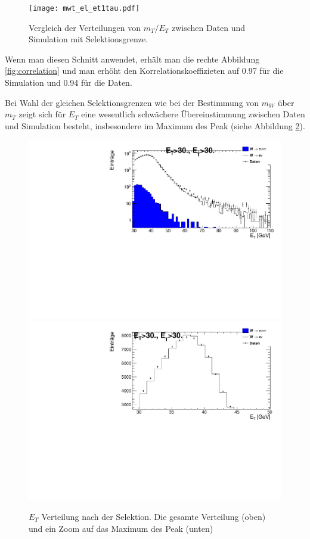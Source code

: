 \documentclass[a4paper,12pt]{article}
\begin{document}
\begin{figure}[htb]
	\centering
	\texttt{[image: mwt\_el\_et1tau.pdf]}
	\caption{Vergleich der Verteilungen von $m_T/E_T$ zwischen Daten und Simulation mit
	Selektionsgrenze.}
	\label{fig:verhaeltnis}
\end{figure}

Wenn man diesen Schnitt anwendet, erhält man die rechte Abbildung \ref{fig:correlation} und man
erhöht den Korrelationskoeffizieten auf 0.97 für die Simulation und 0.94 für die Daten.

Bei Wahl der gleichen Selektionsgrenzen wie bei der Bestimmung von $m_{W}$ über $m_T$ zeigt sich
für $E_{T}$ eine wesentlich schwächere Übereinstimmung zwischen Daten und Simulation besteht, insbesondere
im Maximum des Peak (siehe Abbildung \ref{fig:etaftercut}).
\begin{figure}[htb]
	\centering
	\includegraphics[width=1\textwidth]{E_t_aftercut.pdf}
	\includegraphics[width=1\textwidth]{E_t_aftercut_peak.pdf}
	\caption{$E_{T}$ Verteilung nach der Selektion. Die gesamte Verteilung (oben) und ein Zoom auf das Maximum des Peak (unten) }
	\label{fig:etaftercut}
\end{figure}
\end{document}

